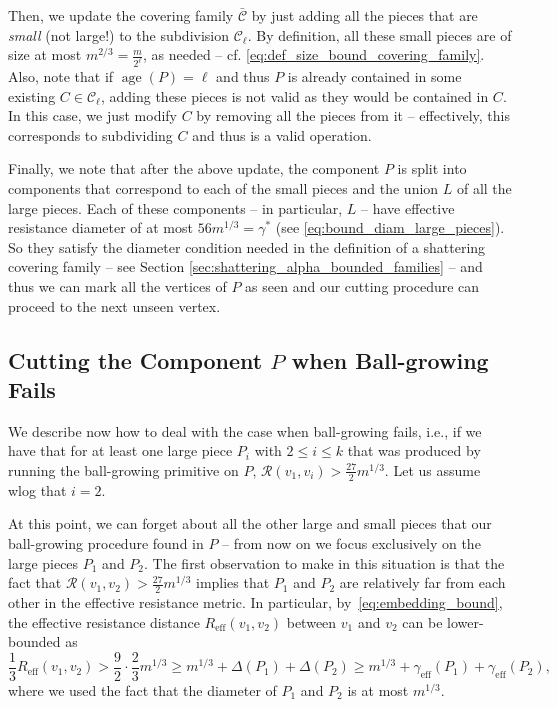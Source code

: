 \documentclass[11pt, letterpaper]{article}
\DeclareMathOperator{\age}{age}
\newcommand{\cC}{\mathcal{C}}
\newcommand{\ocC}{\bar{\mathcal{C}}}
\newcommand{\Dstar}{\gamma^*}
\newcommand{\Reff}{R_{\mathrm{eff}}}
\newcommand{\diameff}{\gamma_{\mathrm{eff}}}
\newcommand{\diamdist}{\Delta}
\newcommand{\cR}{\mathcal{R}}
\begin{document}
Then, we update the covering family $\ocC$ by just adding all the pieces that are {\em small} (not large!) to the subdivision $\cC_\ell$. By definition, all these small pieces are of size at most $m^{2/3} = \frac{m}{2^{\ell}}$, as needed -- cf. \eqref{eq:def_size_bound_covering_family}. Also, note that if $\age(P)=\ell$ and thus $P$ is already contained in some existing $C\in \cC_{\ell}$, adding these pieces is not valid as they would be contained in $C$. In this case, we just modify $C$ by removing all the pieces from it -- effectively, this corresponds to subdividing $C$ and thus is a valid operation. 

Finally, we note that after the above update, the component $P$ is split into components that correspond to each of the small pieces and the union $L$ of all the large pieces. Each of these components -- in particular, $L$ -- have effective resistance diameter of at most $56 m^{1/3}=\Dstar$ (see \eqref{eq:bound_diam_large_pieces}). So they satisfy the diameter condition needed in the definition of a shattering covering family -- see Section \ref{sec:shattering_alpha_bounded_families} -- and thus we can mark all the vertices of $P$ as seen and our cutting procedure can proceed to the next unseen vertex. 


\subsection{Cutting the Component $P$ when Ball-growing Fails}\label{sec:ball_growing_fails}

We describe now how to deal with the case when ball-growing fails, i.e., if we have that for at least one large piece $P_i$ with $2\leq i\leq k$ that was produced by running the ball-growing primitive on $P$, $\cR(v_1,v_i)>\frac {27}{2} m^{1/3}$. Let us assume wlog that $i=2$. 

At this point, we can forget about all the other large and small pieces that our ball-growing procedure found in $P$ -- from now on we focus exclusively on the large pieces $P_1$ and $P_2$. The first observation to make in this situation is that the fact that $\cR(v_1,v_2)>\frac {27}{2} m^{1/3}$ implies that $P_1$ and $P_2$ are relatively far from each other in the effective resistance metric. In particular, by~\eqref{eq:embedding_bound}, the effective resistance distance $\Reff(v_1,v_2)$ between $v_1$ and $v_2$ can be lower-bounded as
\begin{equation} \label{eq:before_good_cut_lemma}
\frac 13 \Reff(v_1,v_2) > \frac {9}{2} \cdot \frac 23 m^{1/3} \ge m^{1/3} + \diamdist(P_1) + \diamdist(P_2) \ge m^{1/3} + \diameff(P_1) + \diameff(P_2),
\end{equation}
where we used the fact that the diameter of $P_1$ and $P_2$ is at most $m^{1/3}$. 
\end{document}
